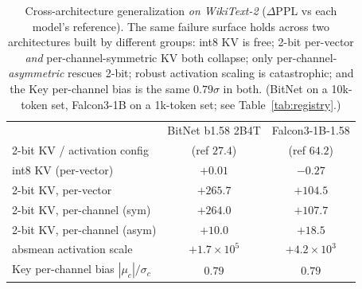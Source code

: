 \begin{table}[t]\centering\small
\caption{Cross-architecture generalization \emph{on WikiText-2} ($\Delta$PPL vs each
model's reference). The same failure surface holds across two architectures built by
different groups: int8 KV is free; 2-bit per-vector \emph{and} per-channel-symmetric
KV both collapse; only per-channel-\emph{asymmetric} rescues 2-bit; robust activation
scaling is catastrophic; and the Key per-channel bias is the same $0.79\sigma$ in
both. (BitNet on a 10k-token set, Falcon3-1B on a 1k-token set; see Table~\ref{tab:registry}.)}
\label{tab:crossmodel}
\begin{tabular}{lcc}
\toprule
& BitNet b1.58 2B4T & Falcon3-1B-1.58\\
2-bit KV / activation config & (ref $27.4$) & (ref $64.2$)\\
\midrule
int8 KV (per-vector) & $+0.01$ & $-0.27$\\
2-bit KV, per-vector & $+265.7$ & $+104.5$\\
2-bit KV, per-channel (sym) & $+264.0$ & $+107.7$\\
2-bit KV, per-channel (asym) & $\mathbf{+10.0}$ & $\mathbf{+18.5}$\\
absmean activation scale & $+1.7{\times}10^5$ & $+4.2{\times}10^3$\\
\midrule
Key per-channel bias $|\mu_c|/\sigma_c$ & $0.79$ & $0.79$\\
\bottomrule
\end{tabular}
\end{table}
